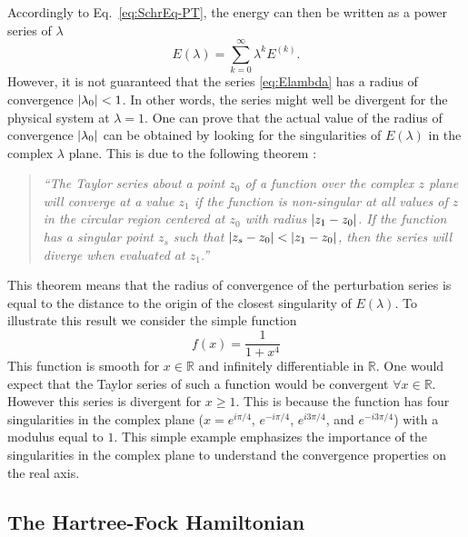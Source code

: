 \documentclass[11pt,a4paper]{article}
\begin{document}
Accordingly to Eq.~\eqref{eq:SchrEq-PT}, the energy can then be written as a power series of $\lambda$
\begin{equation} \label{eq:Elambda}
	E(\lambda) = \sum_{k=0}^\infty \lambda^k E^{(k)}.
\end{equation}
However, it is not guaranteed that the series \eqref{eq:Elambda} has a radius of convergence $\abs{\lambda_0} < 1$. 
In other words, the series might well be divergent for the physical system at $\lambda = 1$. 
One can prove that the actual value of the radius of convergence $\abs{\lambda_0}$ can be obtained by looking for the singularities of $E(\lambda)$ in the complex $\lambda$ plane.
This is due to the following theorem \cite{Goodson_2012}: 
\begin{quote}
	\textit{``The Taylor series about a point $z_0$ of a function over the complex $z$ plane will converge at a value $z_1$ if the function is non-singular at all values of $z$ in the circular region centered at $z_0$ with radius $\abs{z_1-z_0}$. If the function has a singular point $z_s$ such that $\abs{z_s-z_0} < \abs{z_1-z_0}$, then the series will diverge when evaluated at $z_1$.''}
\end{quote}
This theorem means that the radius of convergence of the perturbation series is equal to the distance to the origin of the closest singularity of $E(\lambda)$. To illustrate this result we  consider the simple function \cite{BenderBook}
\begin{equation} \label{eq:DivExample}
	f(x)=\frac{1}{1+x^4}
\end{equation}
This function is smooth for $x \in \mathbb{R}$ and infinitely differentiable in $\mathbb{R}$. One would expect that the Taylor series of such a function would be convergent $\forall x \in \mathbb{R}$. However this series is divergent for $x \ge 1$. This is because the function has four singularities in the complex plane ($x = e^{i\pi/4}$, $e^{-i\pi/4}$, $e^{i3\pi/4}$, and $e^{-i3\pi/4}$) with a modulus equal to $1$. This simple example emphasizes the importance of the singularities in the complex plane to understand the convergence properties on the real axis.


\subsection{The Hartree-Fock Hamiltonian}
\end{document}
